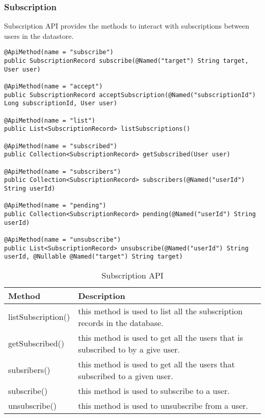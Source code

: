 \subsubsection{Subscription}
Subscription API provides the methods to interact with subscriptions between users in the datastore. \\
\begin{minipage}{\linewidth}
\begin{lstlisting}
@ApiMethod(name = "subscribe")
public SubscriptionRecord subscribe(@Named("target") String target, User user)

@ApiMethod(name = "accept")
public SubscriptionRecord acceptSubscription(@Named("subscriptionId") Long subscriptionId, User user)

@ApiMethod(name = "list")
public List<SubscriptionRecord> listSubscriptions()

@ApiMethod(name = "subscribed")
public Collection<SubscriptionRecord> getSubscribed(User user)

@ApiMethod(name = "subscribers")
public Collection<SubscriptionRecord> subscribers(@Named("userId") String userId) 

@ApiMethod(name = "pending")
public Collection<SubscriptionRecord> pending(@Named("userId") String userId)

@ApiMethod(name = "unsubscribe")
public List<SubscriptionRecord> unsubscribe(@Named("userId") String userId, @Nullable @Named("target") String target)
\end{lstlisting}
\end{minipage}

\begin{table}[h]
\begin{center}
    \begin{tabular}{| l | p{12cm} |}
        \hline Method & Description \\
        \hline listSubscription() & 
            this method is used to list all the subscription records in the database. \\
        \hline getSubscribed() & 
            this method is used to get all the users that is subscribed to by a give user. \\
        \hline subsribers() & 
            this method is used to get all the users that subscribed to a given user. \\
        \hline subscribe() & 
            this method is used to subscribe to a user. \\
        \hline unsubscribe() & 
            this method is used to unsubscribe from a user. \\
        \hline
    \end{tabular}
    \caption{Subscription API}
\end{center}
\end{table}

